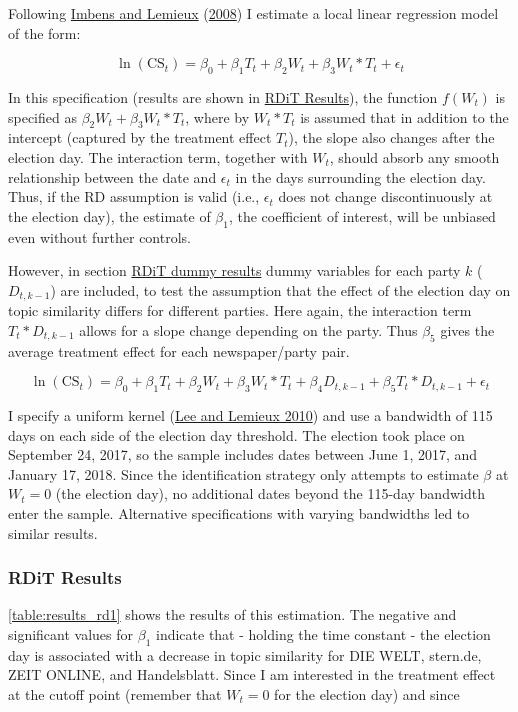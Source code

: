 \documentclass[
  12pt,
]{article}
\begin{document}
Following \protect\hyperlink{ref-imbens_regression_2008}{Imbens and
Lemieux} (\protect\hyperlink{ref-imbens_regression_2008}{2008}) I
estimate a local linear regression model of the form:

\[
\ln(\text{CS}_{t})=\beta_0+\beta_1T_t+\beta_2W_t+\beta_3W_t*T_t+\epsilon_t
\]

In this specification (results are shown in
\protect\hyperlink{RDiT-Results}{RDiT Results}), the function \(f(W_t)\)
is specified as \(\beta_2W_t+\beta_3W_t*T_t\), where by \(W_t*T_t\) is
assumed that in addition to the intercept (captured by the treatment
effect \(T_t\)), the slope also changes after the election day. The
interaction term, together with \(W_t\), should absorb any smooth
relationship between the date and \(\epsilon_t\) in the days surrounding
the election day. Thus, if the RD assumption is valid (i.e.,
\(\epsilon_t\) does not change discontinuously at the election day), the
estimate of \(\beta_1\), the coefficient of interest, will be unbiased
even without further controls.

However, in section \protect\hyperlink{RDiT-dummy-results}{RDiT dummy
results} dummy variables for each party \(k\) (\(D_{t,k-1}\)) are
included, to test the assumption that the effect of the election day on
topic similarity differs for different parties. Here again, the
interaction term \(T_t*D_{t,k-1}\) allows for a slope change depending
on the party. Thus \(\beta_5\) gives the average treatment effect for
each newspaper/party pair.

\[
\ln(\text{CS}_{t})=\beta_0+\beta_1T_t+\beta_2W_{t}+\beta_3W_t*T_t+\beta_4D_{t,k-1}+\beta_5T_t*D_{t,k-1}+\epsilon_t
\]

I specify a uniform kernel
(\protect\hyperlink{ref-lee_regression_2010}{Lee and Lemieux 2010}) and
use a bandwidth of 115 days on each side of the election day threshold.
The election took place on September 24, 2017, so the sample includes
dates between June 1, 2017, and January 17, 2018. Since the
identification strategy only attempts to estimate \(\beta\) at \(W_t=0\)
(the election day), no additional dates beyond the 115-day bandwidth
enter the sample. Alternative specifications with varying bandwidths led
to similar results.

\hypertarget{rdit-results}{%
\subsubsection{RDiT Results}\label{rdit-results}}

\autoref{table:results_rd1} shows the results of this estimation. The
negative and significant values for \(\beta_1\) indicate that - holding
the time constant - the election day is associated with a decrease in
topic similarity for DIE WELT, stern.de, ZEIT ONLINE, and Handelsblatt.
Since I am interested in the treatment effect at the cutoff point
(remember that \(W_t=0\) for the election day) and since
\end{document}
